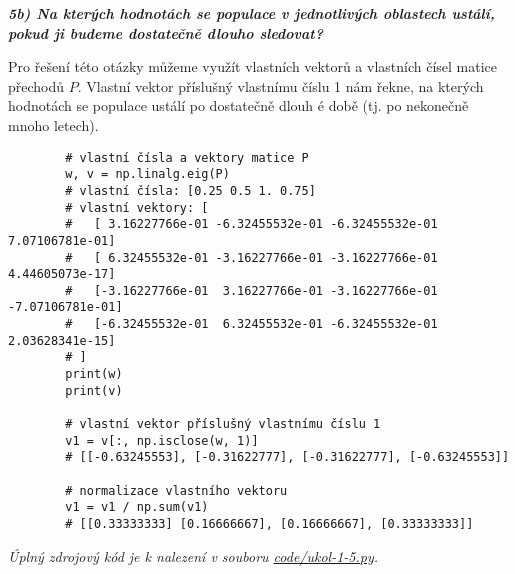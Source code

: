 \documentclass[10pt, a4paper]{ReportSheet}
\begin{document}
\begin{uloha}{5}{3}

        \vspace{5em}

        \textbf{\textit{5b) Na kterých hodnotách se populace v jednotlivých oblastech ustálí, pokud ji budeme dostatečně
        dlouho sledovat?}}

        Pro řešení této otázky můžeme využít vlastních vektorů a vlastních čísel matice přechodů $P$.
        Vlastní vektor příslušný vlastnímu číslu 1 nám řekne, na kterých hodnotách se populace ustálí po dostatečně dlouh
        é době (tj. po nekonečně mnoho letech).
        \begin{verbatim}
        # vlastní čísla a vektory matice P
        w, v = np.linalg.eig(P)
        # vlastní čísla: [0.25 0.5 1. 0.75]
        # vlastní vektory: [
        #   [ 3.16227766e-01 -6.32455532e-01 -6.32455532e-01  7.07106781e-01]
        #   [ 6.32455532e-01 -3.16227766e-01 -3.16227766e-01  4.44605073e-17]
        #   [-3.16227766e-01  3.16227766e-01 -3.16227766e-01 -7.07106781e-01]
        #   [-6.32455532e-01  6.32455532e-01 -6.32455532e-01  2.03628341e-15]
        # ]
        print(w)
        print(v)

        # vlastní vektor příslušný vlastnímu číslu 1
        v1 = v[:, np.isclose(w, 1)]
        # [[-0.63245553], [-0.31622777], [-0.31622777], [-0.63245553]]

        # normalizace vlastního vektoru
        v1 = v1 / np.sum(v1)
        # [[0.33333333] [0.16666667], [0.16666667], [0.33333333]]
        \end{verbatim}


        \textit{
            Úplný zdrojový kód je k nalezení v souboru \href{https://github.com/filipditrich/MMAD-2024/blob/main/code/ukol-1-5.py}{code/ukol-1-5.py}.
        }
    \end{uloha}
\end{document}
